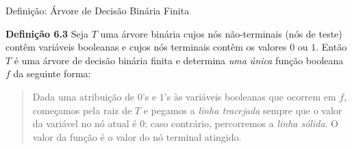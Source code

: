 \expandafter\documentclass\expandafter[table, usenames, svgnames, dvipsnames,14pt, \classopts]{beamer}
\begin{document}
\begin{frame}{Definição: Árvore de Decisão Binária Finita}

    \begin{block}{\textbf{Definição 6.3}}
        \small
        Seja $T$ uma árvore binária cujos nós não-terminais (nós de teste) contêm variáveis booleanas e cujos nós terminais contêm os valores $0$ ou $1$. Então $T$ é uma árvore de decisão binária finita e determina \textit{uma única} função booleana $f$ da seguinte forma:
        
        \begin{quotation}
        \noindent\justifying
        Dada uma atribuição de $0$'s e $1$'s às variáveis booleanas que ocorrem em $f$, começamos pela raiz de $T$ e pegamos a \textit{linha tracejada} sempre que o valor da variável no nó atual é $0$; caso contrário, percorremos a \textit{linha sólida}. O valor da função é o valor do nó terminal atingido.
        \end{quotation}
    \end{block}

\end{frame}
\end{document}
